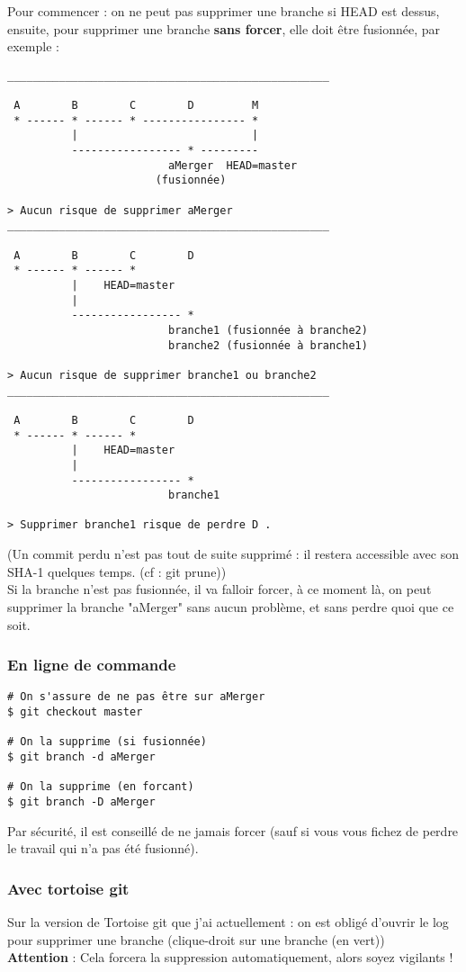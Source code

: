 Pour commencer : on ne peut pas supprimer une branche si HEAD est dessus, ensuite, pour supprimer une branche \textbf{sans forcer}, elle doit être fusionnée, par exemple :
\begin{verbatim}
__________________________________________________

 A        B        C        D         M
 * ------ * ------ * ---------------- *      
          |                           |            
          ----------------- * ---------
                         aMerger  HEAD=master
                       (fusionnée)
                       
> Aucun risque de supprimer aMerger
__________________________________________________
                       
 A        B        C        D        
 * ------ * ------ *      
          |    HEAD=master                         
          |                                        
          ----------------- *                      
                         branche1 (fusionnée à branche2)
                         branche2 (fusionnée à branche1)

> Aucun risque de supprimer branche1 ou branche2
__________________________________________________

 A        B        C        D        
 * ------ * ------ *      
          |    HEAD=master                         
          |                                        
          ----------------- *                      
                         branche1

> Supprimer branche1 risque de perdre D .       
\end{verbatim}
(Un commit perdu n'est pas tout de suite supprimé : il restera accessible avec son SHA-1 quelques temps. (cf : git prune))\\

Si la branche n'est pas fusionnée, il va falloir forcer, à ce moment là, on peut supprimer la branche "aMerger" sans aucun problème, et sans perdre quoi que ce soit.
\newpage
\subsubsection{En ligne de commande}
\begin{verbatim}
# On s'assure de ne pas être sur aMerger
$ git checkout master

# On la supprime (si fusionnée)
$ git branch -d aMerger

# On la supprime (en forcant)
$ git branch -D aMerger
\end{verbatim}

Par sécurité, il est conseillé de ne jamais forcer (sauf si vous vous fichez de perdre le travail qui n'a pas été fusionné).

\subsubsection{Avec tortoise git}
Sur la version de Tortoise git que j'ai actuellement : on est obligé d'ouvrir le log pour supprimer une branche (clique-droit sur une branche (en vert))\\

\textbf{Attention} : Cela forcera la suppression automatiquement, alors soyez vigilants !
